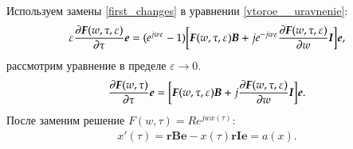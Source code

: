 Используем замены \eqref{first_changes} в уравнении \eqref{vtoroe__uravnenie}:
\[\varepsilon \pdv{\boldsymbol{F}(w,\tau,\varepsilon)}{\tau} \boldsymbol{e} = 
(e^{jw\varepsilon} - 1)  \bigg[\boldsymbol{F}(w,\tau,\varepsilon) \boldsymbol{B}+
je^{-jw\varepsilon}  \pdv{\boldsymbol{F}(w,\tau,\varepsilon)}{w}\boldsymbol{I}   \bigg]\boldsymbol{e},\]
рассмотрим уравнение в пределе $\varepsilon \rightarrow 0$.
\[ \pdv{\boldsymbol{F}(w,\tau)}{\tau}\boldsymbol{e} = 
\bigg[\boldsymbol{F}(w,\tau,\varepsilon)\boldsymbol{B} +
j \pdv{\boldsymbol{F}(w,\tau,\varepsilon)}{w} \boldsymbol{I}  \bigg]\boldsymbol{e}.\]
После заменим решение $F(w,\tau)=Re^{jwx(\tau)}$:
\begin{align}\label{a(x)}
	x'(\tau)=\boldsymbol{rBe}-x(\tau)\boldsymbol{rIe}=a(x).
\end{align}

\begin{comment}
Откуда получам, что:
\[x(\tau) = ce^{-\boldsymbol{\overline{E}KR}\tau} + \frac{\boldsymbol{\overline{E}C_{1,0}R}}{\boldsymbol{\overline{E}KR}}\]
\[c \in [-\frac{\boldsymbol{\overline{E}C_{1,0}R}}{\boldsymbol{\overline{E}KR}};+\infty) \subset \mathbb{R},
\text{ потому что }\]\[\frac{x(\tau)}{\sigma}\text{- среднее количество заявок на орбите, а оно должно быть неотрицатеоьным.}\]
Если 
\[c \in [-\frac{\boldsymbol{\overline{E}C_{1,0}R}}{\boldsymbol{\overline{E}KR}};0] \subset \mathbb{R}, \text{ то }
x \in [\frac{\boldsymbol{\overline{E}C_{1,0}R}}{\boldsymbol{\overline{E}KR}}-|c|;
\frac{\boldsymbol{\overline{E}C_{1,0}R}}{\boldsymbol{\overline{E}KR}}]\subset \mathbb{R}\]
Если
\[c \in (0;+\infty) \subset \mathbb{R}, \text{ то }
x \in (\frac{\boldsymbol{\overline{E}C_{1,0}R}}{\boldsymbol{\overline{E}KR}};
\frac{\boldsymbol{\overline{E}C_{1,0}R}}{\boldsymbol{\overline{E}KR}}+c]\subset \mathbb{R}\]
Удостоверся, что правильно решил дифференциальное уравнение.
\end{comment}
